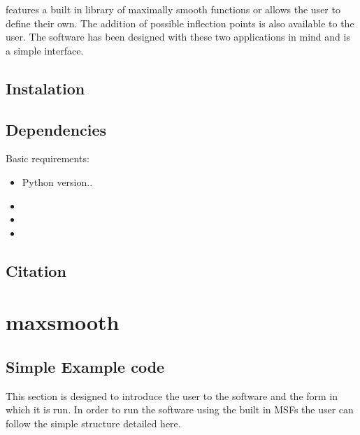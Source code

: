 \documentclass[letterpaper,10pt,english]{sphinxmanual}
\begin{document}
 features a built in library of maximally smooth functions or
allows the user to define their own. The addition of possible inflection points
is also available to the user. The software has been designed with these two
applications in mind and is a simple interface.


\section{Instalation}
\label{\detokenize{source/intro:instalation}}

\section{Dependencies}
\label{\detokenize{source/intro:dependencies}}
Basic requirements:
\begin{itemize}
\item {} 
Python version..

\item {} 

\item {} 

\item {} 

\end{itemize}


\section{Citation}
\label{\detokenize{source/intro:citation}}

\chapter{maxsmooth}
\label{\detokenize{source/maxsmooth:maxsmooth}}\label{\detokenize{source/maxsmooth::doc}}

\section{Simple Example code}
\label{\detokenize{source/maxsmooth:simple-example-code}}
This section is designed to introduce the user to the software and the form
in which it is run. In order to run the  software using the built
in MSFs the user can follow the simple structure detailed here.
\end{document}
